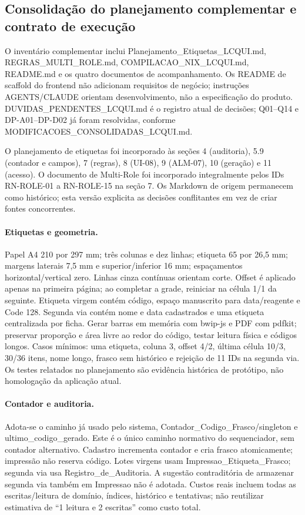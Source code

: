 \subsection{Consolidação do planejamento complementar e contrato de execução}
\label{sec:consolidacao}
O inventário complementar inclui Planejamento\_Etiquetas\_LCQUI.md, REGRAS\_MULTI\_ROLE.md, COMPILACAO\_NIX\_LCQUI.md, README.md e os quatro documentos de acompanhamento. Os README de scaffold do frontend não adicionam requisitos de negócio; instruções AGENTS/CLAUDE orientam desenvolvimento, não a especificação do produto. DUVIDAS\_PENDENTES\_LCQUI.md é o registro atual de decisões; Q01--Q14 e DP-A01--DP-D02 já foram resolvidas, conforme MODIFICACOES\_CONSOLIDADAS\_LCQUI.md.

O planejamento de etiquetas foi incorporado às seções 4 (auditoria), 5.9 (contador e campos), 7 (regras), 8 (UI-08), 9 (ALM-07), 10 (geração) e 11 (acesso). O documento de Multi-Role foi incorporado integralmente pelos IDs RN-ROLE-01 a RN-ROLE-15 na seção 7. Os Markdown de origem permanecem como histórico; esta versão explicita as decisões conflitantes em vez de criar fontes concorrentes.

\paragraph{Etiquetas e geometria.}
Papel A4 210 por 297 mm; três colunas e dez linhas; etiqueta 65 por 26,5 mm; margens laterais 7,5 mm e superior/inferior 16 mm; espaçamentos horizontal/vertical zero. Linhas cinza contínuas orientam corte. Offset é aplicado apenas na primeira página; ao completar a grade, reiniciar na célula 1/1 da seguinte. Etiqueta virgem contém código, espaço manuscrito para data/reagente e Code 128. Segunda via contém nome e data cadastrados e uma etiqueta centralizada por ficha. Gerar barras em memória com bwip-js e PDF com pdfkit; preservar proporção e área livre ao redor do código, testar leitura física e códigos longos. Casos mínimos: uma etiqueta, coluna 3, offset 4/2, última célula 10/3, 30/36 itens, nome longo, frasco sem histórico e rejeição de 11 IDs na segunda via. Os testes relatados no planejamento são evidência histórica de protótipo, não homologação da aplicação atual.

\paragraph{Contador e auditoria.}
Adota-se o caminho já usado pelo sistema, Contador\_Codigo\_Frasco/singleton e ultimo\_codigo\_gerado. Este é o único caminho normativo do sequenciador, sem contador alternativo. Cadastro incrementa contador e cria frasco atomicamente; impressão não reserva código. Lotes virgens usam Impressao\_Etiqueta\_Frasco; segunda via usa Registro\_de\_Auditoria. A sugestão contraditória de armazenar segunda via também em Impressao não é adotada. Custos reais incluem todas as escritas/leitura de domínio, índices, histórico e tentativas; não reutilizar estimativa de ``1 leitura e 2 escritas'' como custo total.

